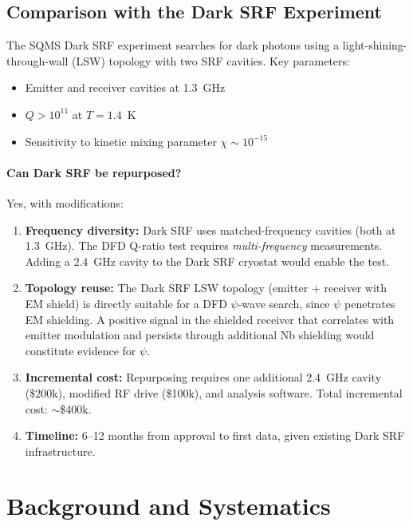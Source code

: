 \documentclass[11pt]{article}
\begin{document}
\subsection{Comparison with the Dark SRF Experiment}

The SQMS Dark SRF experiment searches for dark photons using a
light-shining-through-wall (LSW) topology with two SRF cavities.
Key parameters:
\begin{itemize}[nosep]
\item Emitter and receiver cavities at 1.3~GHz
\item $Q > 10^{11}$ at $T = 1.4$~K
\item Sensitivity to kinetic mixing parameter $\chi \sim 10^{-15}$
\end{itemize}

\paragraph{Can Dark SRF be repurposed?}
Yes, with modifications:
\begin{enumerate}
\item \textbf{Frequency diversity:}  Dark SRF uses matched-frequency
cavities (both at 1.3~GHz).  The DFD Q-ratio test requires
\textit{multi-frequency} measurements.  Adding a 2.4~GHz cavity to
the Dark SRF cryostat would enable the test.

\item \textbf{Topology reuse:}  The Dark SRF LSW topology
(emitter + receiver with EM shield) is directly suitable for a
DFD $\psi$-wave search, since $\psi$ penetrates EM shielding.
A positive signal in the shielded receiver that correlates with
emitter modulation and persists through additional Nb shielding
would constitute evidence for $\psi$.

\item \textbf{Incremental cost:}  Repurposing requires one additional
2.4~GHz cavity (\$200k), modified RF drive (\$100k), and
analysis software.  Total incremental cost: $\sim$\$400k.

\item \textbf{Timeline:}  6--12 months from approval to first data,
given existing Dark SRF infrastructure.
\end{enumerate}

\section{Background and Systematics}
\label{sec:srf-backgrounds}
\end{document}
